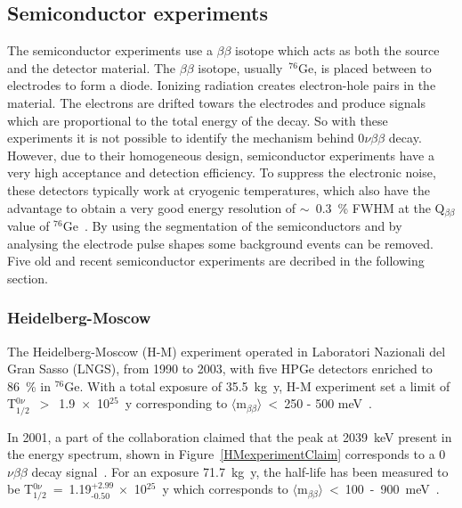 \documentclass[main.tex]{subfiles}
\begin{document}
\subsection{Semiconductor experiments}


\NI The semiconductor experiments use a $\beta\beta$ isotope which acts as both the source and the detector material. The $\beta\beta$ isotope, usually~$^{\text{76}}$Ge, is placed between to electrodes to form a diode. Ionizing radiation creates electron-hole pairs in the material. The electrons are drifted towars the electrodes and produce signals which are proportional to the total energy of the decay. So with these experiments it is not possible to identify the mechanism behind 0$\nu\beta\beta$ decay. However, due to their homogeneous design, semiconductor experiments have a very high acceptance and detection efficiency. To suppress the electronic noise, these detectors typically work at cryogenic temperatures, which also have the advantage to obtain a very good energy resolution of $\sim$~0.3~\% FWHM at the Q$_{\beta\beta}$ value of $^{\text{76}}$Ge~\cite{QbetabetaGe}. By using the segmentation of the semiconductors and by analysing the electrode pulse shapes some background events can be removed.  Five old and recent semiconductor experiments are decribed in the following section.


\subsubsection{Heidelberg-Moscow}


\NI The Heidelberg-Moscow (H-M) experiment operated in Laboratori Nazionali del Gran Sasso (LNGS), from 1990 to 2003, with five HPGe detectors enriched to 86~\% in $^{\text{76}}$Ge. With a total exposure of 35.5~kg~y, H-M experiment set a limit of T$_{\text{1/2}}^{0\nu}$~$>$~1.9~$\times$~10$^{\text{25}}$~y corresponding to $\langle \text{m}_{\beta\beta} \rangle$~<~250 - 500 meV~\cite{HeidelbergMoscow1}.


\bigskip


\NI In 2001, a part of the collaboration claimed that the peak at 2039~keV present in the energy spectrum, shown in Figure~\ref{HMexperimentClaim} corresponds to a 0$\nu\beta\beta$ decay signal~\cite{HeidelbergMoscow2}. For an exposure 71.7~kg~y, the half-life has been measured to be T$_{\text{1/2}}^{0\nu}$~=~1.19$^{\text{+2.99}}_{\text{-0.50}}$ $\times$~10$^{\text{25}}$~y which corresponds to $\langle \text{m}_{\beta\beta} \rangle$~<~100~-~900~meV~\cite{HeidelbergMoscow2}.
\end{document}
